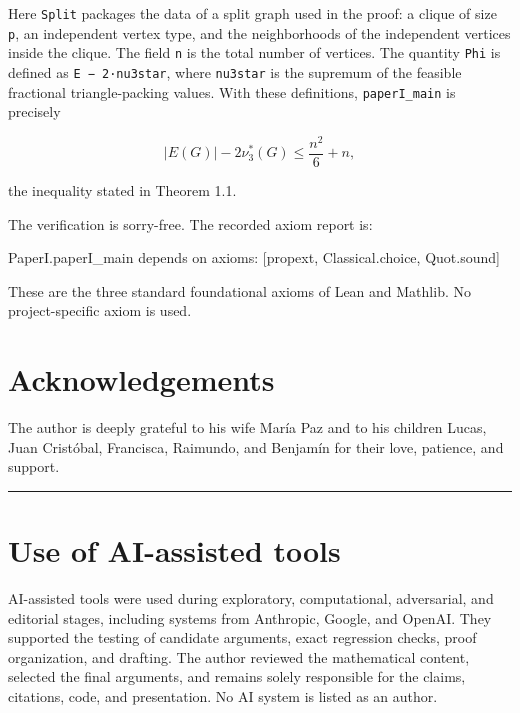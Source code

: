 \documentclass[
  11pt,
]{article}
\newenvironment{Shaded}{}{}
\newcommand{\NormalTok}[1]{#1}
\begin{document}
Here \texttt{Split} packages the data of a split graph used in the
proof: a clique of size \texttt{p}, an independent vertex type, and the
neighborhoods of the independent vertices inside the clique. The field
\texttt{n} is the total number of vertices. The quantity \texttt{Phi} is
defined as \texttt{\textbar{}E\textbar{}\ −\ 2·nu3star}, where
\texttt{nu3star} is the supremum of the feasible fractional
triangle-packing values. With these definitions, \texttt{paperI\_main}
is precisely

\[
|E(G)|-2\nu_3^*(G)\le \frac{n^2}{6}+n,
\]

the inequality stated in Theorem 1.1.

The verification is sorry-free. The recorded axiom report is:

\begin{Shaded}
\begin{Highlighting}[]
\NormalTok{PaperI.paperI\_main depends on axioms: [propext, Classical.choice, Quot.sound]}
\end{Highlighting}
\end{Shaded}

These are the three standard foundational axioms of Lean and Mathlib. No
project-specific axiom is used.

\section{Acknowledgements}\label{acknowledgements}

The author is deeply grateful to his wife María Paz and to his children
Lucas, Juan Cristóbal, Francisca, Raimundo, and Benjamín for their love,
patience, and support.

\begin{center}\rule{0.5\linewidth}{0.5pt}\end{center}

\section{Use of AI-assisted tools}\label{use-of-ai-assisted-tools}

AI-assisted tools were used during exploratory, computational,
adversarial, and editorial stages, including systems from Anthropic,
Google, and OpenAI. They supported the testing of candidate arguments,
exact regression checks, proof organization, and drafting. The author
reviewed the mathematical content, selected the final arguments, and
remains solely responsible for the claims, citations, code, and
presentation. No AI system is listed as an author.
\end{document}

